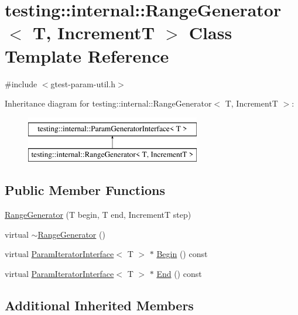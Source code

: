\hypertarget{classtesting_1_1internal_1_1RangeGenerator}{}\section{testing\+::internal\+::Range\+Generator$<$ T, IncrementT $>$ Class Template Reference}
\label{classtesting_1_1internal_1_1RangeGenerator}


{\ttfamily \#include $<$gtest-\/param-\/util.\+h$>$}

Inheritance diagram for testing\+::internal\+::Range\+Generator$<$ T, IncrementT $>$\+:\begin{figure}[H]
\begin{center}
\leavevmode
\includegraphics[height=2.000000cm]{classtesting_1_1internal_1_1RangeGenerator}
\end{center}
\end{figure}
\subsection*{Public Member Functions}
\begin{DoxyCompactItemize}
\item 
\mbox{\hyperlink{classtesting_1_1internal_1_1RangeGenerator_a5b3b83223b9cada3569bcee729e0fdf3}{Range\+Generator}} (T begin, T end, IncrementT step)
\item 
virtual \mbox{\hyperlink{classtesting_1_1internal_1_1RangeGenerator_a680b80b06f471b5f93d8433609017021}{$\sim$\+Range\+Generator}} ()
\item 
virtual \mbox{\hyperlink{classtesting_1_1internal_1_1ParamIteratorInterface}{Param\+Iterator\+Interface}}$<$ T $>$ $\ast$ \mbox{\hyperlink{classtesting_1_1internal_1_1RangeGenerator_ae68b59f9348ecf93e0947545a2424765}{Begin}} () const
\item 
virtual \mbox{\hyperlink{classtesting_1_1internal_1_1ParamIteratorInterface}{Param\+Iterator\+Interface}}$<$ T $>$ $\ast$ \mbox{\hyperlink{classtesting_1_1internal_1_1RangeGenerator_a8d2acbb733791a14df6e7bd3754e9003}{End}} () const
\end{DoxyCompactItemize}
\subsection*{Additional Inherited Members}


